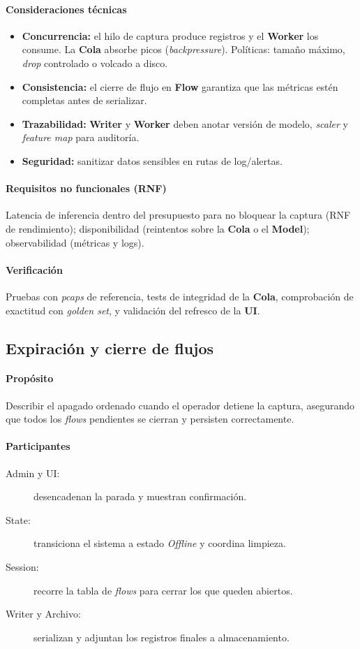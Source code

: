 \paragraph{Consideraciones técnicas}
\begin{itemize}
  \item \textbf{Concurrencia:} el hilo de captura produce registros y el \textbf{Worker} los consume. La \textbf{Cola} absorbe picos (\emph{backpressure}). Políticas: tamaño máximo, \emph{drop} controlado o volcado a disco.
  \item \textbf{Consistencia:} el cierre de flujo en \textbf{Flow} garantiza que las métricas estén completas antes de serializar.
  \item \textbf{Trazabilidad:} \textbf{Writer} y \textbf{Worker} deben anotar versión de modelo, \emph{scaler} y \emph{feature map} para auditoría.
  \item \textbf{Seguridad:} sanitizar datos sensibles en rutas de log/alertas.
\end{itemize}

\paragraph{Requisitos no funcionales (RNF)}
Latencia de inferencia dentro del presupuesto para no bloquear la captura (RNF de rendimiento); disponibilidad (reintentos sobre la \textbf{Cola} o el \textbf{Model}); observabilidad (métricas y logs).

\paragraph{Verificación}
Pruebas con \emph{pcaps} de referencia, tests de integridad de la \textbf{Cola}, comprobación de exactitud con \emph{golden set}, y validación del refresco de la \textbf{UI}.

\subsection{Expiración y cierre de flujos}

\paragraph{Propósito}
Describir el apagado ordenado cuando el operador detiene la captura, asegurando que todos los \emph{flows} pendientes se cierran y persisten correctamente.

\paragraph{Participantes}
\begin{description}
  \item[Admin y UI:] desencadenan la parada y muestran confirmación.
  \item[State:] transiciona el sistema a estado \emph{Offline} y coordina limpieza.
  \item[Session:] recorre la tabla de \emph{flows} para cerrar los que queden abiertos.
  \item[Writer y Archivo:] serializan y adjuntan los registros finales a almacenamiento.
\end{description}

